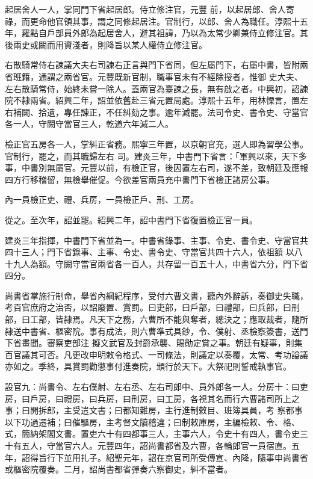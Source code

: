 \begin{pinyinscope}
 起居舍人一人，掌同門下省起居郎。侍立修注官，元豐
 前，以起居郎、舍人寄祿，而更命他官領其事，謂之同修起居注。官制行，以郎、舍人為職任。淳熙十五年，羅點自戶部員外郎為起居舍人，避其祖諱，乃以為太常少卿兼侍立修注官。其後兩史或闕而用資淺者，則降旨以某人權侍立修注官。



 右散騎常侍右諫議大夫右司諫右正言與門下省同，但左屬門下，右屬中書，皆附兩省班籍，通謂之兩省官。元豐既新官制，職事官未有不經除授者，惟御
 史大夫、左右散騎常侍，始終未嘗一除人。蓋兩官為臺諫之長，無有啟之者。中興初，詔諫院不隸兩省。紹興二年，詔並依舊赴三省元置局處。淳熙十五年，用林慄言，置左右補闕、拾遺，專任諫正，不任糾劾之事。逾年減罷。法司令史、書令史、守當官各一人，守闕守當官三人，乾道六年減二人。



 檢正官五房各一人，掌糾正省務。熙寧三年置，以京朝官充，選人即為習學公事。官制行，罷之，而其職歸左右
 司。建炎三年，中書門下省言：「軍興以來，天下多事，中書別無屬官。元豐以前，有檢正官，後因置左右司，遂不差，致朝廷及應報四方行移稽留，無檢舉催促。今欲差官兩員充中書門下省檢正諸房公事。



 內一員檢正吏、禮、兵房，一員檢正戶、刑、工房。



 從之。至次年，詔並罷。紹興二年，詔中書門下省復置檢正官一員。



 建炎三年指揮，中書門下省並為一。中書省錄事、主事、令史、書令史、守當官共四十三人；門下省錄事、主事、令史、書令史、守當官共四十六人，依祖額
 以八十九人為額。守闕守當官兩省各一百人，共存留一百五十人，中書省六分，門下省四分。



 尚書省掌施行制命，舉省內綱紀程序，受付六曹文書，聽內外辭訴，奏御史失職，考百官庶府之治否，以詔廢置、賞罰。曰吏部，曰戶部，曰禮部，曰兵部，曰刑部，曰工部，皆隸焉。凡天下之務，六曹所不能與奪者，總決之；應取裁者，隨所隸送中書省、樞密院。事有成法，則六曹準式具鈔，令、僕射、丞檢察簽書，送門下省畫聞。審察吏部注
 擬文武官及封爵承襲、賜勛定賞之事。朝廷有疑事，則集百官議其可否。凡更改申明敕令格式、一司條法，則議定以奏覆，太常、考功謚議亦如之。季終，具賞罰勸懲事付進奏院，頒行於天下。大祭祀則誓戒執事官。



 設官九：尚書令、左右僕射、左右丞、左右司郎中、員外郎各一人。分房十：曰吏房，曰戶房，曰禮房，曰兵房，曰刑房，曰工房，各視其名而行六曹諸司所上之事；曰開拆郎，主受遣文書；曰都知雜房，主行進制敕目、班簿具員，考
 察都事以下功過遷補；曰催驅房，主考督文牘稽違；曰制敕庫房，主編檢敕、令、格、式，簡納架閣文書。置吏六十有四都事三人，主事六人，令史十有四人，書令史三十有五人，守當官六人。元豐四年，詔尚書都省及六曹，各輪郎官一員宿直。五年，詔得旨行下並用扎子。紹聖元年，詔在京官司所受傳宣、內降，隨事申尚書省或樞密院覆奏。二月，詔尚書都省彈奏六察御史，糾不當者。




\end{pinyinscope}

